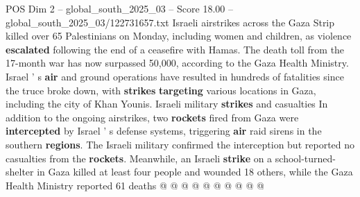 \begin{textsample}{POS Dim 2 – global\_south\_2025\_03 – Score 18.00 – global\_south\_2025\_03/122731657.txt}
Israeli airstrikes across the Gaza Strip killed over 65 Palestinians on Monday, including women and children, as violence \textbf{escalated} following the end of a ceasefire with Hamas.
The death toll from the 17-month war has now surpassed 50,000, according to the Gaza Health Ministry.
Israel ' s \textbf{air} and ground operations have resulted in hundreds of fatalities since the truce broke down, with \textbf{strikes} \textbf{targeting} various locations in Gaza, including the city of Khan Younis.
Israeli military \textbf{strikes} and casualties In addition to the ongoing airstrikes, two \textbf{rockets} fired from Gaza were \textbf{intercepted} by Israel ' s defense systems, triggering \textbf{air} raid sirens in the southern \textbf{regions}.
The Israeli military confirmed the interception but reported no casualties from the \textbf{rockets}.
Meanwhile, an Israeli \textbf{strike} on a school-turned-shelter in Gaza killed at least four people and wounded 18 others, while the Gaza Health Ministry reported 61 deaths @ @ @ @ @ @ @ @ @ @

\end{textsample}
